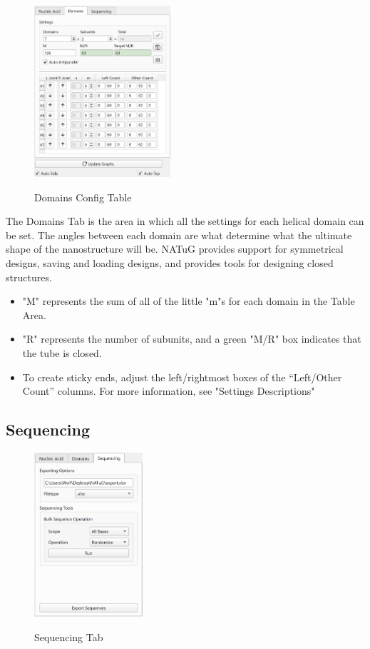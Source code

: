 \documentclass[titlepage]{article}
\begin{document}
	\begin{figure}[h]
		\centering
		\caption{Domains Config Table}
		\includegraphics[height=2.5in]{domain-config-table.png}
		\label{fig:domain-config-table}
	\end{figure}

	The Domains Tab is the area in which all the settings for each helical domain can be set. The angles between each domain are what determine what the ultimate shape of the nanostructure will be. NATuG provides support for symmetrical designs, saving and loading designs, and provides tools for designing closed structures.
	
	\begin{itemize}
		\item "M" represents the sum of all of the little "m"s for each domain in the Table Area.
		\item "R" represents the number of subunits, and a green "M/R" box indicates that the tube is closed.
		\item To create sticky ends, adjust the left/rightmost boxes of the “Left/Other Count” columns. For more information, see "Settings Descriptions"
	\end{itemize}
	
	\subsection{Sequencing}
	
	\begin{figure}
		\centering
		\caption{Sequencing Tab}
		\includegraphics[height=2.4in]{sequencing-tab.png}
		\label{fig:sequencing-tab}
	\end{figure}
	
\end{document}

